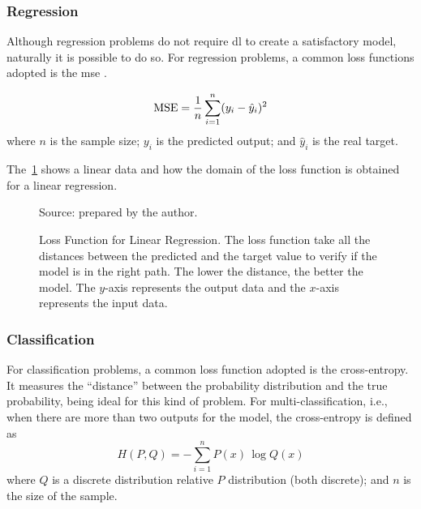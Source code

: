 \subsubsection*{Regression}

Although regression problems do not require \gls*{dl} to create a satisfactory model, naturally it is possible to do so.
For regression problems, a common loss functions adopted is the \gls*{mse} \citep{bussab2017}. 

\begin{equation}
    \text{MSE} = \frac{1}{n} \sum_{i=1}^n (y_i - \hat{y}_i)^2
    \label{eq:mse}
\end{equation}
%
where \(n\) is the sample size; \(y_i\) is the predicted output; and \(\hat{y}_i\) is the real target.

The~\cref{fig:mae_chart} shows a linear data and how the domain of the loss function is obtained for a linear regression.
%
\begin{figure}[!htb]
    \centering
    \caption[Loss Function for Linear Regression]{Loss Function for Linear Regression. The loss function take all the distances between the predicted and the target value to verify if the model is in the right path. The lower the distance, the better the model. The \(y\)-axis represents the output data and the \(x\)-axis represents the input data.}
    
    \begin{flushleft}\footnotesize
        Source: prepared by the author.
    \end{flushleft}
    
    \label{fig:mae_chart}
\end{figure}

\subsubsection*{Classification}

For classification problems, a common loss function adopted is the cross-entropy.
It measures the ``distance'' between the probability distribution and the true probability, being ideal for this kind of problem.
For multi-classification, i.e., when there are more than two outputs for the model, the cross-entropy is defined as
%
\begin{equation}
    H(P,Q) = - \sum_{i=1}^n P(x) \, \log Q(x)
    \label{eq:cross_entropy}
\end{equation}
%
where \(Q\) is a discrete distribution relative \(P\) distribution (both discrete); and \(n\) is the size of the sample.

